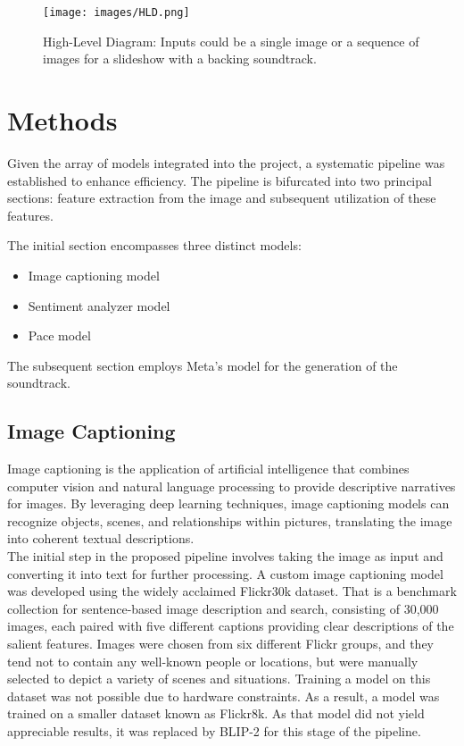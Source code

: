 \documentclass[conference]{IEEEtran}
\begin{document}
\begin{figure}[ht]
    \centering
    \texttt{[image: images/HLD.png]}
    \caption{High-Level Diagram: Inputs could be a single image or a sequence of images for a slideshow with a backing soundtrack.}
    \label{fig:high-level-diagram}
\end{figure}

\section{Methods}
Given the array of models integrated into the project, a systematic pipeline was established to enhance efficiency. The pipeline is bifurcated into two principal sections: feature extraction from the image and subsequent utilization of these features.

The initial section encompasses three distinct models:
\begin{itemize}
    \item Image captioning model
    \item Sentiment analyzer model
    \item Pace model
\end{itemize}

The subsequent section employs Meta's model for the generation of the soundtrack.

\subsection{Image Captioning}

Image captioning is the application of artificial intelligence that combines computer vision and natural language processing to provide descriptive narratives for images. By leveraging deep learning techniques, image captioning models can recognize objects, scenes, and relationships within pictures, translating the image into coherent textual descriptions. 
\\

The initial step in the proposed pipeline involves taking the image as input and converting it into text for further processing. A custom image captioning model was developed using the widely acclaimed Flickr30k dataset. That is a benchmark collection for sentence-based image description and search, consisting of 30,000 images, each paired with five different captions providing clear descriptions of the salient features. Images were chosen from six different Flickr groups, and they tend not to contain any well-known people or locations, but were manually selected to depict a variety of scenes and situations. Training a model on this dataset was not possible due to hardware constraints. As a result, a model was trained on a smaller dataset known as Flickr8k. As that model did not yield appreciable results, it was replaced by BLIP-2 for this stage of the pipeline.
\end{document}
